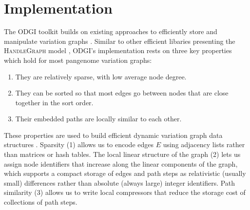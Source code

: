 \documentclass{bioinfo}
\newcommand{\red}[1]{{\textcolor{Red}{#1}}}
\newcommand{\FIXME}[1]{\red{[FIXME: #1]}}
\begin{document}



\section{Implementation}

The ODGI toolkit builds on existing approaches to efficiently store and manipulate variation graphs \citep{Garrison:2018}.
Similar to other efficient libaries presenting the \textsc{HandleGraph} model \citep{Eizenga_2020_BX}, ODGI's implementation rests on three key properties which hold for most pangenome variation graphs:

\begin{enumerate}
\item They are relatively sparse, with low average node degree.
\item They can be sorted so that most edges go between nodes that are close together in the sort order.
\item Their embedded paths are locally similar to each other.
\end{enumerate}

These properties are used to build efficient dynamic variation graph data structures \citep{Siren:2020,Eizenga_2020_BX}.
Sparsity (1) allows us to encode edges $E$ using adjacency lists rather than matrices or hash tables.
The local linear structure of the graph (2) lets us assign node identifiers that increase along the linear components of the graph, which supports a compact storage of edges and path steps as relativistic (usually small) differences rather than absolute (always large) integer identifiers.
Path similarity (3) allows us to write local compressors that reduce the storage cost of collections of path steps.
\end{document}
